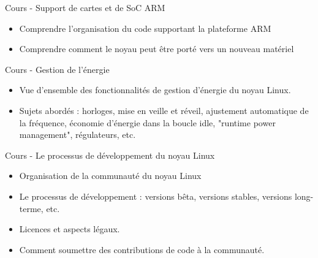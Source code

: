 \documentclass[a4paper,12pt,obeyspaces,spaces,hyphens]{article}
\begin{document}
\feagendatwocolumn
{Cours - Support de cartes et de SoC ARM}
{
  \begin{itemize}
  \item Comprendre l'organisation du code supportant la plateforme ARM
  \item Comprendre comment le noyau peut être porté vers un nouveau
    matériel
  \end{itemize}
}
{Cours - Gestion de l'énergie}
{
  \begin{itemize}
  \item Vue d'ensemble des fonctionnalités de gestion d'énergie du noyau
    Linux.
  \item Sujets abordés : horloges, mise en veille et réveil, ajustement
    automatique de la fréquence, économie d'énergie dans la boucle idle,
    "runtime power management", régulateurs, etc.
  \end{itemize}
}

\feagendaonecolumn
{Cours - Le processus de développement du noyau Linux}
{
  \begin{itemize}
  \item Organisation de la communauté du noyau Linux
  \item Le processus de développement : versions bêta, versions stables,
    versions long-terme, etc.
  \item Licences et aspects légaux.
  \item Comment soumettre des contributions de code à la communauté.
  \end{itemize}
}
\end{document}
